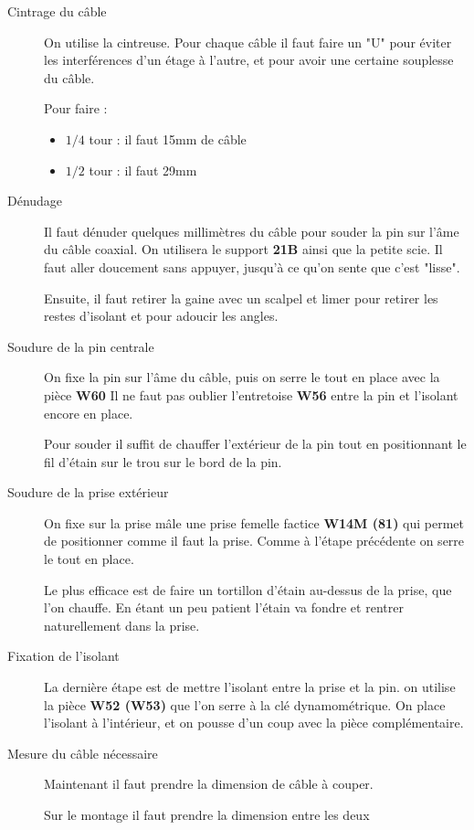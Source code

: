 \documentclass[a4paper,11pt]{article}
\begin{document}
\begin{description}
    \item[Cintrage du câble] On utilise la cintreuse. Pour chaque câble il faut faire un "U" pour éviter les interférences d'un étage à l'autre, et pour avoir une certaine souplesse du câble.
    
    Pour faire : 
    \begin{itemize}
        \item $1/4$ tour : il faut 15mm de câble
        \item $1/2$ tour : il faut 29mm
    \end{itemize}
     \item[Dénudage] Il faut dénuder quelques millimètres du câble pour souder la pin sur l'âme du câble coaxial.
     On utilisera le support \textbf{21B} ainsi que la petite scie. Il faut aller doucement sans appuyer, jusqu'à ce qu'on sente que c'est "lisse".
     
     Ensuite, il faut retirer la gaine avec un scalpel et limer pour retirer les restes d'isolant et pour adoucir les angles.
     \item[Soudure de la pin centrale] On fixe la pin sur l'âme du câble, puis on serre le tout en place avec la pièce \textbf{W60} Il ne faut pas oublier l'entretoise \textbf{W56} entre la pin et l'isolant encore en place.
     
     Pour souder il suffit de chauffer l'extérieur de la pin tout en positionnant le fil d'étain sur le trou sur le bord de la pin.
     \item[Soudure de la prise extérieur] On fixe sur la prise mâle une prise femelle factice \textbf{W14M (81)} qui permet de positionner comme il faut la prise. Comme à l'étape précédente on serre le tout en place.
     
     Le plus efficace est de faire un tortillon d'étain au-dessus de la prise, que l'on chauffe. En étant un peu patient l'étain va fondre et rentrer naturellement dans la prise.
     \item[Fixation de l'isolant] La dernière étape est de mettre l'isolant entre la prise et la pin. on utilise la pièce \textbf{W52 (W53)}
     que l'on serre à la clé dynamométrique. On place l'isolant à l'intérieur, et on pousse d'un coup avec la pièce complémentaire.
     
     \item[Mesure du câble nécessaire] Maintenant il faut prendre la dimension de câble à couper.
     
     Sur le montage il faut prendre la dimension entre les deux 
     
\end{description}
\end{document}
